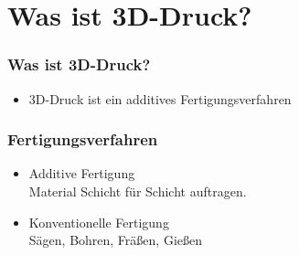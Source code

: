 \section{Was ist 3D-Druck?}
\begin{frame}
  \frametitle{Was ist 3D-Druck?}
  \pause
  \begin{itemize}
    \item{3D-Druck ist ein additives Fertigungsverfahren}
  \end{itemize}
\end{frame}
\begin{frame}
  \frametitle{Fertigungsverfahren}
  \pause
  \begin{itemize}
    \item Additive Fertigung \\
    Material Schicht für Schicht auftragen. \pause
    \item Konventionelle Fertigung \\
    Sägen, Bohren, Fräßen, Gießen
  \end{itemize}
\end{frame}

